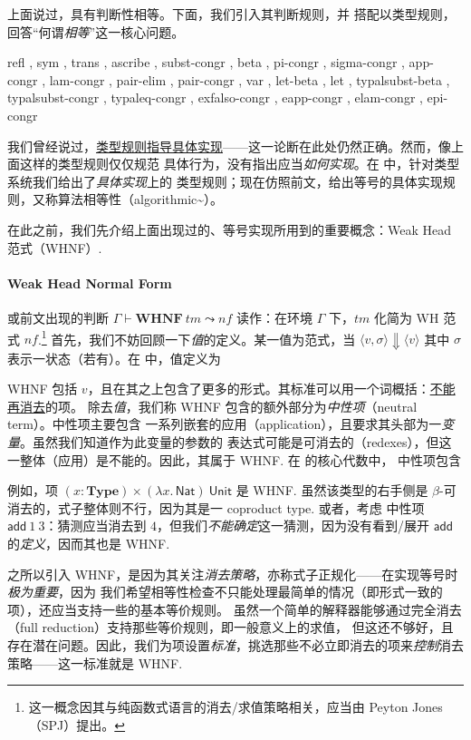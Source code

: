 \documentclass[a4paper, 11pt]{article}
\theoremstyle{remark}\newtheorem*{remark}{Remark}
\theoremstyle{definition}\newtheorem*{definition}{Definition}
\begin{document}
上面说过，\Tigrisd 具有判断性相等。下面，我们引入其判断规则，并
搭配以类型规则，回答“何谓\emph{相等}”这一核心问题。

{ refl
, sym
, trans
, ascribe
, subst-congr
, beta
, pi-congr
, sigma-congr
, app-congr
, lam-congr
, pair-elim
, pair-congr
, var
, let-beta
, let
, typalsubst-beta
, typalsubst-congr
, typaleq-congr
, exfalso-congr
, eapp-congr
, elam-congr
, epi-congr}

我们曾经说过，\underline{类型规则指导具体实现}——这一论断在此处仍然正确。然而，像上面这样的类型规则仅仅规范
具体行为，没有指出应当\emph{如何实现}。在 \Tigris 中，针对类型系统我们给出了\emph{具体实现}上的
类型规则；现在仿照前文，给出等号的具体实现规则，又称算法相等性（algorithmic\textasciitilde）。

在此之前，我们先介绍上面出现过的、等号实现所用到的重要概念：Weak Head 范式（WHNF）.

\paragraph{Weak Head Normal Form} 或前文出现的判断 $\Gamma\vdash\mathbf{WHNF}\ tm\leadsto nf$
读作：在环境 $\Gamma$ 下，$tm$ 化简为 WH 范式 $nf$.\footnote{
这一概念因其与纯函数式语言的消去/求值策略相关，应当由 Peyton Jones（SPJ）提出。
}
首先，我们不妨回顾一下\emph{值}的定义。某一值为范式，当 $\langle v, \sigma\rangle\Downarrow\langle v\rangle$ 其中
$\sigma$ 表示一状态（若有）。在 \Tigrisd 中，值定义为


WHNF 包括 $v$，且在其之上包含了更多的形式。其标准可以用一个词概括：\underline{不能再消去}的项。
除去\emph{值}，我们称 WHNF 包含的额外部分为\emph{中性项}（neutral term）。中性项主要包含
一系列嵌套的应用（application），且要求其头部为一\emph{变量}。虽然我们知道作为此变量的参数的
表达式可能是可消去的（redexes），但这一整体（应用）是不能的。因此，其属于 WHNF. 在 \Tigrisd 的核心代数中，
中性项包含


例如，项 $(x : \mathbf{Type})\times (\lambda x.\,\mathsf{Nat})\ \mathsf{Unit}$ 是 WHNF.
虽然该类型的右手侧是 $\beta$-可消去的，式子整体则不行，因为其是一 coproduct type. 或者，考虑
中性项 $\mathsf{add}\ 1\ 3$：猜测应当消去到 $4$，但我们\emph{不能确定}这一猜测，因为没有看到/展开
$\mathsf{add}$ 的\emph{定义}，因而其也是 WHNF.

之所以引入 WHNF，是因为其关注\emph{消去策略}，亦称式子正规化——在实现等号时\emph{极为重要}，因为
我们希望相等性检查不只能处理最简单的情况（即形式一致的项），还应当支持一些\lambdacalc 的基本等价规则。
虽然一个简单的解释器能够通过完全消去（full reduction）支持那些等价规则，即一般意义上的求值，
但这还不够好，且存在潜在问题。因此，我们为项设置\emph{标准}，挑选那些不必立即消去的项来\emph{控制}消去策略——这一标准就是 WHNF.
\end{document}
